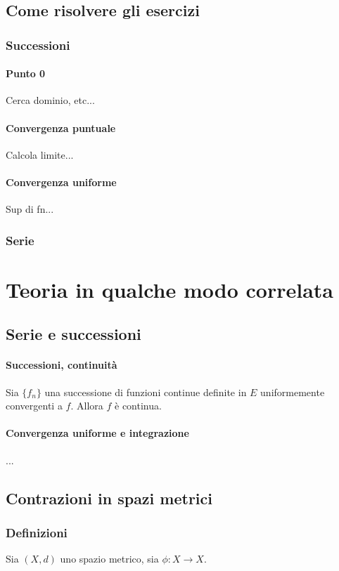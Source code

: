 \documentclass[a4paper,12pt]{article}
\begin{document}
\subsection{Come risolvere gli esercizi}
\subsubsection{Successioni}
\paragraph{Punto 0}
Cerca dominio, etc...
\paragraph{Convergenza puntuale}
Calcola limite...
\paragraph{Convergenza uniforme}
Sup di fn...

\subsubsection{Serie}

\section{Teoria in qualche modo correlata}

\subsection{Serie e successioni}
\paragraph{Successioni, continuità}
Sia $\{f_n\}$ una successione di funzioni continue definite in $E$ uniformemente convergenti a $f$. Allora $f$ è continua.
\paragraph{Convergenza uniforme e integrazione}
...

\subsection{Contrazioni in spazi metrici}
\subsubsection{Definizioni}
Sia $(X, d)$ uno spazio metrico, sia $\phi : X\rightarrow X$.
\end{document}
